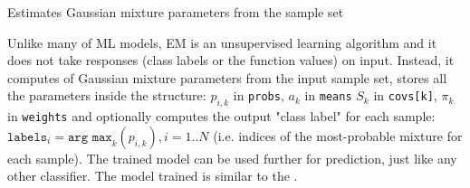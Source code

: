 Estimates Gaussian mixture parameters from the sample set


Unlike many of ML models, EM is an unsupervised learning algorithm and it does not take responses (class labels or the function values) on input. Instead, it computes  of Gaussian mixture parameters from the input sample set, stores all the parameters inside the structure: $p_{i,k}$ in \texttt{probs}, $a_k$ in \texttt{means} $S_k$ in \texttt{covs[k]}, $\pi_k$ in \texttt{weights} and optionally computes the output "class label" for each sample: $\texttt{labels}_i=\texttt{arg max}_k(p_{i,k}), i=1..N$ (i.e. indices of the most-probable mixture for each sample).
\newline
\newline
The trained model can be used further for prediction, just like any other classifier. The model trained is similar to the .



